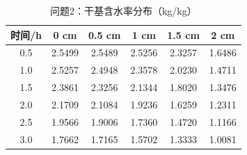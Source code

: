 \begin{table}[H]\centering
\caption{问题2：干基含水率分布（kg/kg）}\label{tab:q2C}
\begin{tabular}{cccccc}\toprule
时间/h & 0 cm & 0.5 cm & 1 cm & 1.5 cm & 2 cm\\ \midrule
0.5 & 2.5499 & 2.5489 & 2.5256 & 2.3257 & 1.6486\\
1.0 & 2.5257 & 2.4948 & 2.3578 & 2.0230 & 1.4711\\
1.5 & 2.3861 & 2.3256 & 2.1344 & 1.8020 & 1.3476\\
2.0 & 2.1709 & 2.1084 & 1.9236 & 1.6259 & 1.2311\\
2.5 & 1.9566 & 1.9006 & 1.7360 & 1.4720 & 1.1166\\
3.0 & 1.7662 & 1.7165 & 1.5702 & 1.3333 & 1.0081\\
\bottomrule\end{tabular}\end{table}
